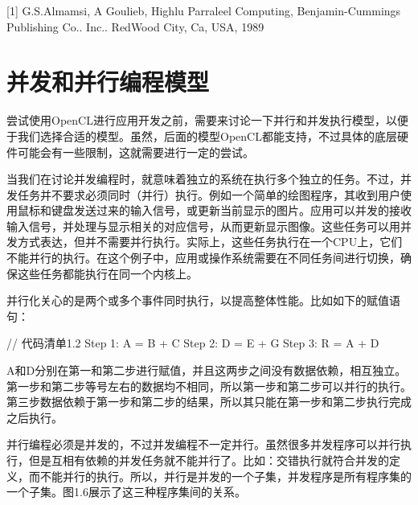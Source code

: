 
\myRefRule

\begin{myRefs}

[1] G.S.Almamsi, A Goulieb, Highlu Parraleel Computing, Benjamin-Cummings Publishing Co.. Inc.. RedWood City, Ca, USA, 1989

\end{myRefs}



\section{并发和并行编程模型}

尝试使用OpenCL进行应用开发之前，需要来讨论一下并行和并发执行模型，以便于我们选择合适的模型。虽然，后面的模型OpenCL都能支持，不过具体的底层硬件可能会有一些限制，这就需要进行一定的尝试。

当我们在讨论并发编程时，就意味着独立的系统在执行多个独立的任务。不过，并发任务并不要求必须同时（并行）执行。例如一个简单的绘图程序，其收到用户使用鼠标和键盘发送过来的输入信号，或更新当前显示的图片。应用可以并发的接收输入信号，并处理与显示相关的对应信号，从而更新显示图像。这些任务可以用并发方式表达，但并不需要并行执行。实际上，这些任务执行在一个CPU上，它们不能并行的执行。在这个例子中，应用或操作系统需要在不同任务间进行切换，确保这些任务都能执行在同一个内核上。

并行化关心的是两个或多个事件同时执行，以提高整体性能。比如如下的赋值语句：

\begin{codebox}[text]
// 代码清单1.2
Step 1: A = B + C
Step 2: D = E + G
Step 3: R = A + D
\end{codebox}

A和D分别在第一和第二步进行赋值，并且这两步之间没有数据依赖，相互独立。第一步和第二步等号左右的数据均不相同，所以第一步和第二步可以并行的执行。第三步数据依赖于第一步和第二步的结果，所以其只能在第一步和第二步执行完成之后执行。

并行编程必须是并发的，不过并发编程不一定并行。虽然很多并发程序可以并行执行，但是互相有依赖的并发任务就不能并行了。比如：交错执行就符合并发的定义，而不能并行的执行。所以，并行是并发的一个子集，并发程序是所有程序集的一个子集。图1.6展示了这三种程序集间的关系。


